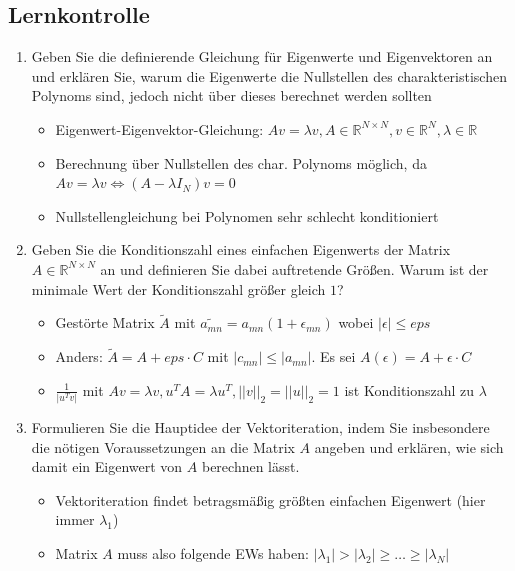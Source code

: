 \documentclass[]{article}
\newcommand*{\real}{\ensuremath{\mathbb{R}}}
\begin{document}
\subsection{Lernkontrolle}
	\begin{enumerate}
		\item Geben Sie die definierende Gleichung für Eigenwerte und Eigenvektoren an und erklären Sie, warum die Eigenwerte die Nullstellen des charakteristischen Polynoms sind, jedoch nicht über dieses berechnet werden sollten
			\begin{itemize}
				\item Eigenwert-Eigenvektor-Gleichung: $Av = \lambda v, A \in \real^{N \times N}, v \in \real^N, \lambda \in \real$
				\item Berechnung über Nullstellen des char. Polynoms möglich, da $Av = \lambda v  \Leftrightarrow (A- \lambda I_N)v = 0$
				\item Nullstellengleichung bei Polynomen sehr schlecht konditioniert
			\end{itemize}
		\item Geben Sie die Konditionszahl eines einfachen Eigenwerts der Matrix $A \in \real^{N \times N}$ an und definieren Sie dabei auftretende Größen. Warum ist der minimale Wert der Konditionszahl größer gleich $1$?
			\begin{itemize}
				\item Gestörte Matrix $\tilde{A}$ mit $\tilde{a_{mn}} = a_{mn}(1 + \epsilon_{mn})$ wobei $|\epsilon| \leq eps$
				\item Anders: $\tilde{A} = A + eps\cdot C$ mit $|c_{mn}| \leq |a_{mn}|$. Es sei $A(\epsilon) = A + \epsilon \cdot C$
				\item $\frac{1}{|u^Tv|}$ mit $Av = \lambda v, u^TA = \lambda u^T, ||v||_2 = ||u||_2 = 1$ ist Konditionszahl zu $\lambda$
			\end{itemize}
		\item Formulieren Sie die Hauptidee der Vektoriteration, indem Sie insbesondere die nötigen Voraussetzungen an die Matrix $A$ angeben und erklären, wie sich damit ein Eigenwert von $A$ berechnen lässt.
			\begin{itemize}
				\item Vektoriteration findet betragsmäßig größten einfachen Eigenwert (hier immer $\lambda_1$)
				\item Matrix $A$ muss also folgende EWs haben: $|\lambda_1| > |\lambda_2| \geq \dots \geq |\lambda_N|$

\end{itemize}
\end{enumerate}
\end{document}
